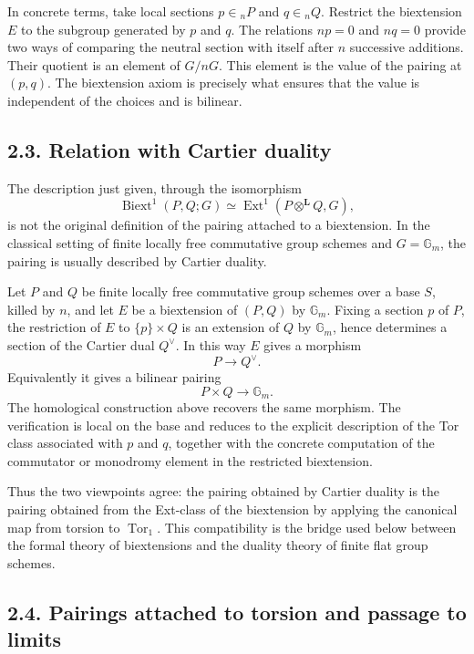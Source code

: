 \documentclass[11pt]{article}
\theoremstyle{plain}
\theoremstyle{definition}
\theoremstyle{remark}
\DeclareMathOperator{\Ext}{Ext}
\DeclareMathOperator{\Tor}{Tor}
\DeclareMathOperator{\Biext}{Biext}
\newcommand{\Gm}{\mathbb G_m}
\newcommand{\bL}{\mathbf L}
\begin{document}
In concrete terms, take local sections \(p\in {}_nP\) and \(q\in {}_nQ\).
Restrict the biextension \(E\) to the subgroup generated by \(p\) and \(q\). The
relations \(np=0\) and \(nq=0\) provide two ways of comparing the neutral section
with itself after \(n\) successive additions. Their quotient is an element of
\(G/nG\). This element is the value of the pairing at \((p,q)\). The
biextension axiom is precisely what ensures that the value is independent of the
choices and is bilinear.

\subsection*{2.3. Relation with Cartier duality}

The description just given, through the isomorphism
\[
\Biext^1(P,Q;G)\simeq \Ext^1(P\otimes^{\bL}Q,G),
\]
is not the original definition of the pairing attached to a biextension. In the
classical setting of finite locally free commutative group schemes and
\(G=\Gm\), the pairing is usually described by Cartier duality.

Let \(P\) and \(Q\) be finite locally free commutative group schemes over a base
\(S\), killed by \(n\), and let \(E\) be a biextension of \((P,Q)\) by
\(\Gm\). Fixing a section \(p\) of \(P\), the restriction of \(E\) to
\(\{p\}\times Q\) is an extension of \(Q\) by \(\Gm\), hence determines a section
of the Cartier dual \(Q^\vee\). In this way \(E\) gives a morphism
\[
P\longrightarrow Q^\vee.
\]
Equivalently it gives a bilinear pairing
\[
P\times Q\longrightarrow \Gm.
\]
The homological construction above recovers the same morphism. The verification
is local on the base and reduces to the explicit description of the Tor class
associated with \(p\) and \(q\), together with the concrete computation of the
commutator or monodromy element in the restricted biextension.

Thus the two viewpoints agree: the pairing obtained by Cartier duality is the
pairing obtained from the Ext-class of the biextension by applying the canonical
map from torsion to \(\Tor_1\). This compatibility is the bridge used below
between the formal theory of biextensions and the duality theory of finite flat
group schemes.

\subsection*{2.4. Pairings attached to torsion and passage to limits}
\end{document}
